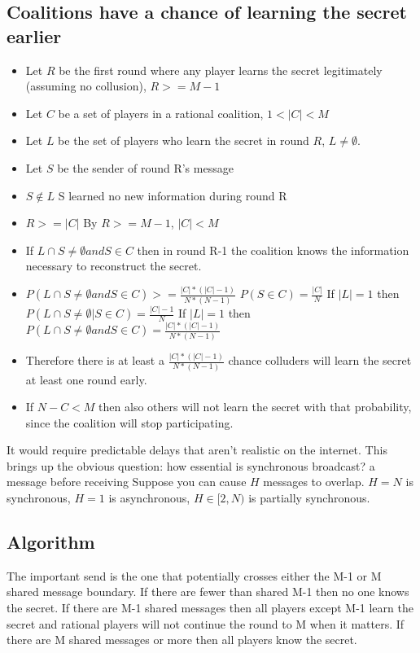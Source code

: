 \documentclass{article}
\begin{document}
\subsection{Coalitions have a chance of learning the secret earlier}
\begin{itemize}
  \item Let $R$ be the first round where any player learns the secret legitimately (assuming no collusion), $R >= M-1$
  \item Let $C$ be a set of players in a rational coalition, $1 < |C| < M$
  \item Let $L$ be the set of players who learn the secret in round $R$, $L \not = \emptyset$.
  \item Let $S$ be the sender of round R's message
  \item $S \not \in L$
    \subitem S learned no new information during round R
  \item $R >= |C|$
    \subitem By $R >= M-1$, $|C| < M$
  \item If $L \cap S \not = \emptyset and S \in C$ then in round R-1 the coalition knows the information necessary to reconstruct the secret.
  \item $P(L \cap S \not = \emptyset and S \in C) >= \frac{|C|*(|C|-1)}{N*(N-1)}$
  	\subitem $P(S \in C) = \frac{|C|}{N}$
    \subitem If $|L| = 1$ then $P(L \cap S \not = \emptyset | S \in C) = \frac{|C|-1}{N}$
    \subitem If $|L| = 1$ then $P(L \cap S \not = \emptyset and S \in C) = \frac{|C|*(|C|-1)}{N*(N-1)}$
  \item Therefore there is at least a $\frac{|C|*(|C|-1)}{N*(N-1)}$ chance colluders will learn the secret at least one round early.
  \item If $N - C < M$ then also others will not learn the secret with that probability, since the coalition will stop participating. 
\end{itemize}

It would require predictable delays that aren't realistic on the internet. This brings up the obvious question: how essential is synchronous broadcast? a message before receiving Suppose you can cause $H$ messages to overlap. $H = N$ is synchronous, $H = 1$ is asynchronous, $H \in [2, N)$ is partially synchronous.

\subsection{Algorithm}
The important send is the one that potentially crosses either the M-1 or M shared message boundary. If there are fewer than shared M-1 then no one knows the secret. If there are M-1 shared messages then all players except M-1 learn the secret and rational players will not continue the round to M when it matters. If there are M shared messages or more then all players know the secret.
\end{document}
